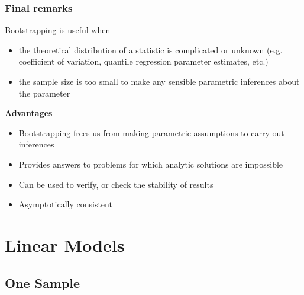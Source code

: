 \documentclass[a4paper]{article}
\begin{document}
\subsubsection{Final remarks}
Bootstrapping is useful when
\begin{itemize}
	\item the theoretical distribution of a statistic is complicated or unknown (e.g. coefficient of variation, quantile regression parameter estimates, etc.)
	\item the sample size is too small to make any sensible parametric inferences about the parameter
\end{itemize}
\textbf{Advantages}
\begin{itemize}
	\item Bootstrapping frees us from making parametric assumptions to carry out inferences
	\item Provides answers to problems for which analytic solutions are impossible
	\item Can be used to verify, or check the stability of results
	\item Asymptotically consistent
\end{itemize}
\section{Linear Models}\label{sec:18}
\subsection{One Sample}
\end{document}
